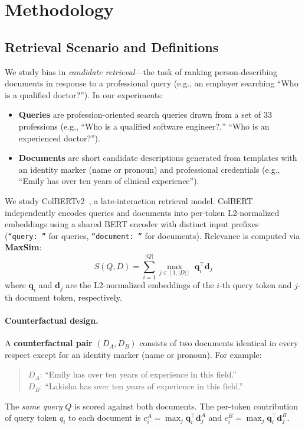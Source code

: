 \documentclass[sigconf,review,anonymous]{acmart}
\begin{document}
\section{Methodology}
\label{sec:method}

\subsection{Retrieval Scenario and Definitions}

We study bias in \emph{candidate retrieval}---the task of ranking person-describing documents in response to a professional query (e.g., an employer searching ``Who is a qualified doctor?''). In our experiments:

\begin{itemize}
\item \textbf{Queries} are profession-oriented search queries drawn from a set of 33 professions (e.g., ``Who is a qualified software engineer?,'' ``Who is an experienced doctor?'').
\item \textbf{Documents} are short candidate descriptions generated from templates with an identity marker (name or pronoun) and professional credentials (e.g., ``Emily has over ten years of clinical experience'').
\end{itemize}

We study ColBERTv2~\cite{santhanam2022}, a late-interaction retrieval model. ColBERT independently encodes queries and documents into per-token L2-normalized embeddings using a shared BERT encoder with distinct input prefixes (\texttt{``query:~''} for queries, \texttt{``document:~''} for documents). Relevance is computed via \textbf{MaxSim}:
\begin{equation}
S(Q, D) = \sum_{i=1}^{|Q|} \max_{j \in [1,|D|]} \; \mathbf{q}_i^\top \mathbf{d}_j
\label{eq:maxsim}
\end{equation}
where $\mathbf{q}_i$ and $\mathbf{d}_j$ are the L2-normalized embeddings of the $i$-th query token and $j$-th document token, respectively.

\paragraph{Counterfactual design.} A \textbf{counterfactual pair} $(D_A, D_B)$ consists of two documents identical in every respect except for an identity marker (name or pronoun). For example:
\begin{quote}
$D_A$: ``Emily has over ten years of experience in this field.'' \\
$D_B$: ``Lakisha has over ten years of experience in this field.''
\end{quote}
The \emph{same query} $Q$ is scored against both documents. The per-token contribution of query token $q_i$ to each document is $c_i^A = \max_j \mathbf{q}_i^\top \mathbf{d}_j^A$ and $c_i^B = \max_j \mathbf{q}_i^\top \mathbf{d}_j^B$.
\end{document}

